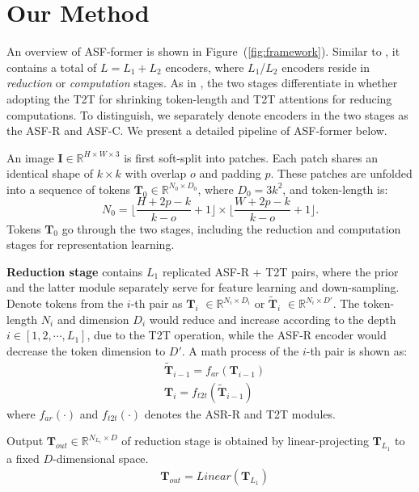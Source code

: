 \documentclass[lettersize,journal]{IEEEtran}
\begin{document}
\section{Our Method}
An overview of ASF-former is shown in Figure~(\ref{fig:framework}). Similar to \cite{Xu2021ViTAEVT,yuan2021tokens}, it contains a total of $L=L_1+L_2$ encoders, where $L_1$/$L_2$ encoders reside in \textit{reduction} or \textit{computation} stages. As in \cite{yuan2021tokens}, the two stages differentiate in whether adopting the T2T for shrinking token-length and T2T attentions for reducing computations. To distinguish, we separately denote encoders in the two stages as the ASF-R and ASF-C. We present a detailed pipeline of ASF-former below.

An image $\boldsymbol{I} \in {\mathbb{R}}^{H \times W \times 3}$ is first soft-split into patches. Each patch shares an identical shape of $k \times k$ with overlap $o$ and padding $p$. These patches are unfolded into a sequence of tokens $\boldsymbol{T}_0 \in {\mathbb{R}}^{N_0 \times D_0}$, where $D_0=3k^2$, and token-length is:
\begin{equation}
    N_0 = \biggl\lfloor{\frac{H+2p-k}{k-o}+1}\biggr\rfloor 
    \times \biggl\lfloor{\frac{W+2p-k}{k-o}+1}\biggr\rfloor.
\label{patch_number}
\end{equation}
Tokens $\boldsymbol{T}_0$ go through the two stages, including the reduction and computation stages for representation learning.  

\textbf{Reduction stage} contains $L_1$ replicated ASF-R + T2T pairs, where the prior and the latter module separately serve for feature learning and down-sampling. Denote tokens from the $i$-th pair as $\boldsymbol{T}_{i}$ $\in \mathbb{R}^{N_{i} \times D_{i}}$ or $\boldsymbol{\widetilde{T}}_{i}$ $\in \mathbb{R}^{N_{i} \times D'}$. The token-length $N_i$ and dimension $D_i$ would reduce and increase according to the depth $i \in [1,2,\cdots, L_1]$, due to the T2T operation, while the ASF-R encoder would decrease the token dimension to $D'$. A math process of the $i$-th pair is shown as:
\begin{align}
    &\boldsymbol{\widetilde{T}}_{i-1}=f_{ar}(\boldsymbol{T}_{i-1})\label{eq:f1}\\
    &\boldsymbol{{T}}_{i}=f_{t2t}(\boldsymbol{\widetilde{T}}_{i-1})\label{eq:f2}
\end{align}
where $f_{ar}\left(\cdot\right)$ and $f_{t2t}\left(\cdot\right)$ denotes the ASR-R and T2T modules.

Output $\boldsymbol{T}_{out} \in \mathbb{R}^{N_{L_1} \times D}$ of reduction stage is obtained by linear-projecting $\boldsymbol{T}_{L_1}$ to a fixed $D$-dimensional space.
\begin{align}
    &\boldsymbol{T}_{out}=Linear\left(\boldsymbol{T}_{L_1}\right)
\end{align}
\end{document}
